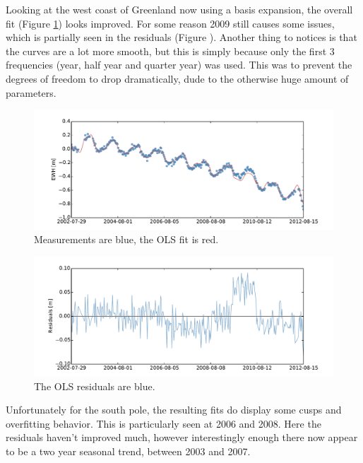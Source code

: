 Looking at the west coast of Greenland now using a basis expansion, the overall fit (Figure \ref{fig:splines-selected-0-fit}) looks improved. For some reason 2009 still causes some issues, which is partially seen in the residuals (Figure \label{fig:splines-selected-0-residual}). Another thing to notices is that the curves are a lot more smooth, but this is simply because only the first 3 frequencies (year, half year and quarter year) was used. This was to prevent the degrees of freedom to drop dramatically, dude to the otherwise huge amount of parameters.
\begin{figure}[H]
	\centering
	\includegraphics[width=\textwidth]{figures/splines-selected-0-fit}
	\caption{Measurements are blue, the OLS fit is red.}
	\label{fig:splines-selected-0-fit}
\end{figure}

\begin{figure}[H]
	\centering
	\includegraphics[width=\textwidth]{figures/splines-selected-0-residual}
	\caption{The OLS residuals are blue.}
	\label{fig:splines-selected-0-residual}
\end{figure}

Unfortunately for the south pole, the resulting fits do display some cusps and overfitting behavior. This is particularly seen at 2006 and 2008. Here the residuals haven't improved much, however interestingly enough there now appear to be a two year seasonal trend, between 2003 and 2007. 


